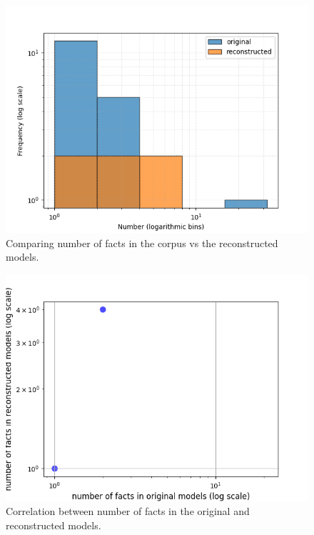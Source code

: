 \begin{figure}[htbp]
\centerline{\includegraphics[width=\linewidth]{"./Comparing number of facts in the corpus vs the reconstructed models.png"}}
\caption{Comparing number of facts in the corpus vs the reconstructed models.}
\label{fig}
\end{figure}


\begin{figure}[htbp]
\centerline{\includegraphics[width=\linewidth]{"./Correlation between number of facts in the original and reconstructed models.png"}}
\caption{Correlation between number of facts in the original and reconstructed models.}
\label{fig}
\end{figure}


